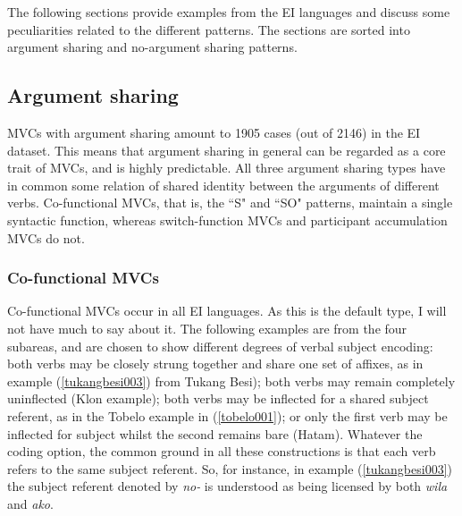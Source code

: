 The following sections provide examples from the EI languages and discuss some peculiarities related to the different patterns. The sections are sorted into argument sharing and no-argument sharing patterns.

\subsection{Argument sharing}

MVCs with argument sharing amount to 1905 cases (out of 2146) in the EI dataset. This means that argument sharing in general can be regarded as a core trait of MVCs, and is highly predictable. All three argument sharing types have in common some relation of shared identity between the arguments of different verbs. Co-functional MVCs, that is, the ``S" and ``SO" patterns, maintain a single syntactic function, whereas switch-function MVCs and participant accumulation MVCs do not.

\subsubsection{Co-functional MVCs}

Co-functional MVCs occur in all EI languages. As this is the default type, I will not have much to say about it. The following examples are from the four subareas, and are chosen to show different degrees of verbal subject encoding: both verbs may be closely strung together and share one set of affixes, as in example (\ref{tukangbesi003}) from Tukang Besi); both verbs may remain completely uninflected (Klon example); both verbs may be inflected for a shared subject referent, as in the Tobelo example in (\ref{tobelo001}); or only the first verb may be inflected for subject whilst the second remains bare (Hatam). Whatever the coding option, the common ground in all these constructions is that each verb refers to the same subject referent. So, for instance, in example (\ref{tukangbesi003}) the subject referent denoted by \textit{no-} is understood as being licensed by both \textit{wila} and \textit{ako}.

